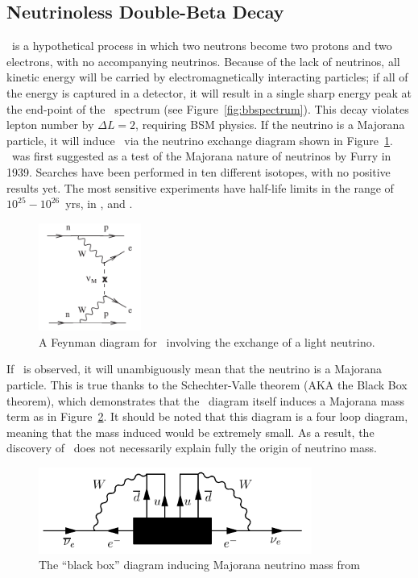 \documentclass[/main.tex]{subfiles}
\begin{document}
\subsection{Neutrinoless Double-Beta Decay}
\znbb\ is a hypothetical process in which two neutrons become two protons and two electrons, with no accompanying neutrinos.
Because of the lack of neutrinos, all kinetic energy will be carried by electromagnetically interacting particles; if all of the energy is captured in a detector, it will result in a single sharp energy peak at the end-point of the \tnbb\ spectrum (see Figure~\ref{fig:bbspectrum}).
This decay violates lepton number by $\Delta L=2$, requiring BSM physics.
If the neutrino is a Majorana particle, it will induce \znbb\ via the neutrino exchange diagram shown in Figure~\ref{fig:bbdiagram}.
\znbb\ was first suggested as a test of the Majorana nature of neutrinos by Furry in 1939\cite{Furry1939}.
Searches have been performed in ten different isotopes, with no positive results yet.
The most sensitive experiments have half-life limits in the range of $10^{25}-10^{26}$~yrs, in \cite{kamlandzen}, \cite{gerda2018} and \cite{Cuore2018}.
\begin{figure}[t]
  \centering
  \includegraphics[width=0.3\textwidth]{znbbDiagramLNE}
  \caption[\znbb\ Decay Diagram]{\label{fig:bbdiagram}
    A Feynman diagram for \znbb\ involving the exchange of a light neutrino.
  }
\end{figure}

If \znbb\ is observed, it will unambiguously mean that the neutrino is a Majorana particle.
This is true thanks to the Schechter-Valle theorem (AKA the Black Box theorem), which demonstrates that the \znbb\ diagram itself induces a Majorana mass term as in Figure~\ref{fig:blackbox}\cite{Schechter1982}.
It should be noted that this diagram is a four loop diagram, meaning that the mass induced would be extremely small.
As a result, the discovery of \znbb\ does not necessarily explain fully the origin of neutrino mass.
\begin{figure}[t]
  \centering
  \includegraphics[width=0.8\textwidth]{blackboxdiagram}
  \caption[\znbb\ Decay Diagram]{\label{fig:blackbox}
    The ``black box'' diagram inducing Majorana neutrino mass from \znbb
  }
\end{figure}
\end{document}
